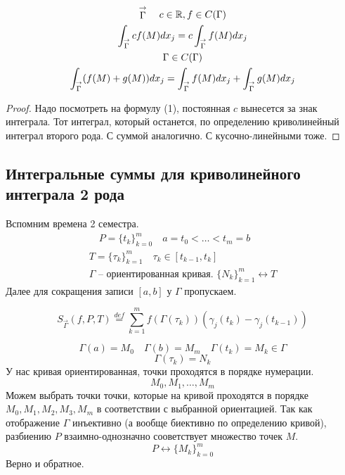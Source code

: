 \documentclass[main]{subfiles}
\begin{document}
\begin{theorem}
    \begin{gather*}
        \stackrel{\rightarrow}{\Gamma} \quad c \in \mathbb{R}, f \in C(\Gamma) \\
        \int_{\stackrel{\rightarrow}{\Gamma}} cf(M)dx_j = c \int_{\stackrel{\rightarrow}{\Gamma}} f(M) dx_j\\
        \Gamma \in C(\Gamma) \\
        \int_{\stackrel{\rightarrow}{\Gamma}} (f(M) + g(M)) dx_j = \int_{\stackrel{\rightarrow}{\Gamma}} f(M) dx_j +
        \int_{\stackrel{\rightarrow}{\Gamma}} g(M)dx_j \\
    \end{gather*}
\end{theorem}
\begin{proof}
    Надо посмотреть на формулу (1), постоянная $c$ вынесется за знак интеграла. Тот интеграл, который останется, по определению криволинейный интеграл второго рода.
    С суммой аналогично. С кусочно-линейными тоже.
\end{proof}

\subsection{Интегральные суммы для криволинейного интеграла 2 рода}
Вспомним времена 2 семестра.
\begin{gather*}
    [a,b] \quad P = \{ t_k \}^m_{k=0} \quad a = t_0 < \ldots < t_m = b \\
    T = \{ \tau_k \}^m_{k=1} \quad \tau_k \in [t_{k-1},t_k] \\
    \Gamma \text{ -- ориентированная кривая. }
    \{ N_k \}^m_{k=1} \leftrightarrow T
\end{gather*}
Далее для сокращения записи $[a,b]$ у $\Gamma$ пропускаем.
\begin{definition}
    \[S_{\stackrel{\rightarrow}{\Gamma}} (f,P,T) \stackrel{def}{=} \sum^m_{k=1}f(\Gamma(\tau_k))(\gamma_j(t_k)-\gamma_j(t_{k-1})) \tag{3}\]
\end{definition}
\begin{remark}
    \[\Gamma(a) = M_0 \quad \Gamma(b) = M_m \quad \Gamma(t_k) = M_k \in \Gamma \]
    \[\Gamma(\tau_k) = N_k \]
    У нас кривая ориентированная, точки проходятся в порядке нумерации.
    \[ M_0, M_1, \ldots, M_m \]
     Можем выбрать точки точки, которые на кривой проходятся в порядке $M_0, M_1, M_2, M_3, M_m$ в соответствии с выбранной ориентацией.
     Так как отображение $\Gamma$ инъективно (а вообще биективно по определению кривой), разбиению $P$ взаимно-однозначно сооветствует множество точек $M$.
     \[ P \leftrightarrow \{ M_k \}^m_{k=0}  \] Верно и обратное.
\end{remark}
\end{document}
